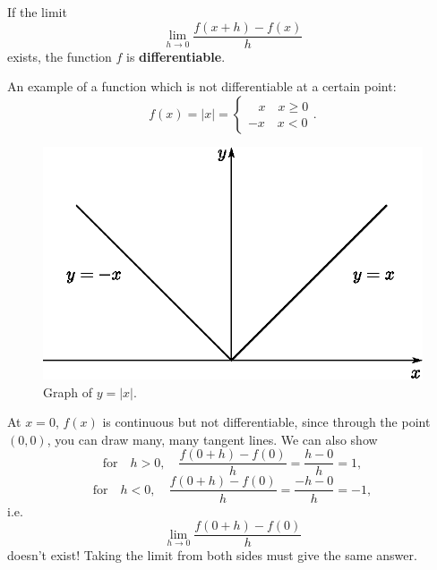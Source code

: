 \begin{definition}
If the limit $$\lim_{h\to0}\frac{f(x+h)-f(x)}{h}$$ exists, the function $f$ is \textbf{differentiable}.
\end{definition}

\begin{example}
An example of a function which is not differentiable at a certain point:
\begin{equation*}
f(x)=|x|=
\begin{cases}
\,\,\,\,\, x\quad x\ge0 \\
-x\quad x<0
\end{cases}.
\end{equation*}

\begin{figure}[H]
\centering
\includegraphics[scale=0.8]{img/mod-x-graph}
\captionstyle{\centering\it}
\caption{Graph of $y=|x|$.}
\label{fig:mod-x-graph}
\end{figure}

At $x=0$, $f(x)$ is continuous but not differentiable, since through the point $(0,0)$, you can draw many, many tangent lines. We can also show
\begin{equation*}
\text{for}\quad h>0,\quad \frac{f(0+h)-f(0)}{h}=\frac{h-0}{h}=1,
\end{equation*}
\begin{equation*}
\text{for}\quad h<0,\quad \frac{f(0+h)-f(0)}{h}=\frac{-h-0}{h}=-1,
\end{equation*}
i.e.
\begin{equation*}
\lim_{h\to0}\frac{f(0+h)-f(0)}{h}
\end{equation*}
doesn't exist! Taking the limit from both sides must give the same answer.
\end{example}

